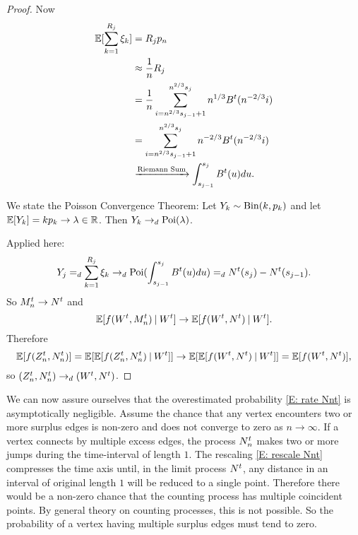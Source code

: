 \begin{proof}
Now
\begin{align*}
\mathbb{E}[\sum_{k=1}^{R_j} \xi_k] 
&= R_j p_n \\
&\approx \frac{1}{n} R_j \\
&= \frac{1}{n} \sum_{i=n^{2 / 3}s_{j-1}+1}^{n^{2 / 3}s_j}n^{1 / 3}B^t(n^{-2 / 3}i) \\
&= \sum_{i=n^{2 / 3}s_{j-1}+1}^{n^{2 / 3}s_j}n^{-2 / 3}B^t(n^{-2 / 3}i) \\
&\xrightarrow{\text{Riemann Sum}} \int_{s_{j-1}}^{s_j} B^t(u)du.
\end{align*}

We state the Poisson Convergence Theorem:
Let $Y_k \sim \operatorname*{Bin}(k, p_k)$ and let $\mathbb{E}[Y_k] = kp_k \rightarrow \lambda \in \mathbb{R}$.
Then $Y_k \rightarrow_d \operatorname*{Poi}(\lambda)$.

Applied here:
\begin{equation}
Y_j =_d \sum_{k=1}^{R_j} \xi_k \rightarrow_d \operatorname*{Poi}( \int_{s_{j-1}}^{s_j} B^t(u)du ) =_d N^t(s_j) - N^t(s_{j-1}).
\end{equation}
So $M_n^t \rightarrow N^t$ and
\begin{equation}
	\mathbb{E}[f(W^t, M_n^t) \: | \: W^t] \rightarrow \mathbb{E}[f(W^t, N^t) \: | \: W^t].
\end{equation}
Therefore
\begin{equation}
	\mathbb{E}[f(Z_n^t, N_n^t)] = \mathbb{E}[\mathbb{E}[f(Z_n^t, N_n^t) \: | \: W^t]] \rightarrow \mathbb{E}[\mathbb{E}[f(W^t, N^t) \: | \: W^t]] = \mathbb{E}[f(W^t, N^t)],
\end{equation}
so $(Z_n^t, N_n^t) \rightarrow_d (W^t, N^t)$.

















\end{proof}

\newpage
We can now assure ourselves that the overestimated probability \eqref{E: rate Nnt} is asymptotically negligible.
Assume the chance that any vertex encounters two or more surplus edges is non-zero and does not converge to zero as $n \rightarrow \infty$.
If a vertex connects by multiple excess edges, the process $N_n^t$ makes two or more jumps during the time-interval of length $1$.
The rescaling \eqref{E: rescale Nnt} compresses the time axis until, in the limit process $N^t$, 
any distance in an interval of original length $1$ will be reduced to a single point.
Therefore there would be a non-zero chance that the counting process has multiple coincident points.
By general theory on counting processes, this is not possible.
So the probability of a vertex having multiple surplus edges must tend to zero.

















